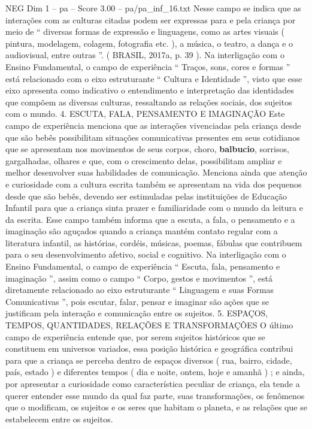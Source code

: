 \begin{textsample}{NEG Dim 1 – pa – Score 3.00 – pa/pa\_inf\_16.txt}
Nesse campo se indica que as interações com as culturas citadas podem ser expressas para e pela criança por meio de “ diversas formas de expressão e linguagens, como as artes visuais ( pintura, modelagem, colagem, fotografia etc. ), a música, o teatro, a dança e o audiovisual, entre outras ”. ( BRASIL, 2017a, p. 39 ).
Na interligação com o Ensino Fundamental, o campo de experiência “ Traços, sons, cores e formas ” está relacionado com o eixo estruturante “ Cultura e Identidade ”, visto que esse eixo apresenta como indicativo o entendimento e interpretação das identidades que compõem as diversas culturas, ressaltando as relações sociais, dos sujeitos com o mundo. 4.
ESCUTA, FALA, PENSAMENTO E IMAGINAÇÃO Este campo de experiência menciona que as interações vivenciadas pela criança desde que são bebês possibilitam situações comunicativas presentes em seus cotidianos que se apresentam nos movimentos de seus corpos, choro, \textbf{balbucio}, sorrisos, gargalhadas, olhares e que, com o crescimento delas, possibilitam ampliar e melhor desenvolver suas habilidades de comunicação.
Menciona ainda que atenção e curiosidade com a cultura escrita também se apresentam na vida dos pequenos desde que são bebês, devendo ser estimuladas pelas instituições de Educação Infantil para que a criança sinta prazer e familiaridade com o mundo da leitura e da escrita.
Esse campo também informa que a escuta, a fala, o pensamento e a imaginação são aguçados quando a criança mantém contato regular com a literatura infantil, as histórias, cordéis, músicas, poemas, fábulas que contribuem para o seu desenvolvimento afetivo, social e cognitivo.
Na interligação com o Ensino Fundamental, o campo de experiência “ Escuta, fala, pensamento e imaginação ”, assim como o campo “ Corpo, gestos e movimentos ”, está diretamente relacionado ao eixo estruturante “ Linguagem e suas Formas Comunicativas ”, pois escutar, falar, pensar e imaginar são ações que se justificam pela interação e comunicação entre os sujeitos. 5.
ESPAÇOS, TEMPOS, QUANTIDADES, RELAÇÕES E TRANSFORMAÇÕES O último campo de experiência entende que, por serem sujeitos históricos que se constituem em universos variados, essa posição histórica e geográfica contribui para que a criança se perceba dentro de espaços diversos ( rua, bairro, cidade, país, estado ) e diferentes tempos ( dia e noite, ontem, hoje e amanhã ) ; e ainda, por apresentar a curiosidade como característica peculiar de criança, ela tende a querer entender esse mundo da qual faz parte, suas transformações, os fenômenos que o modificam, os sujeitos e os seres que habitam o planeta, e as relações que se estabelecem entre os sujeitos.

\end{textsample}
